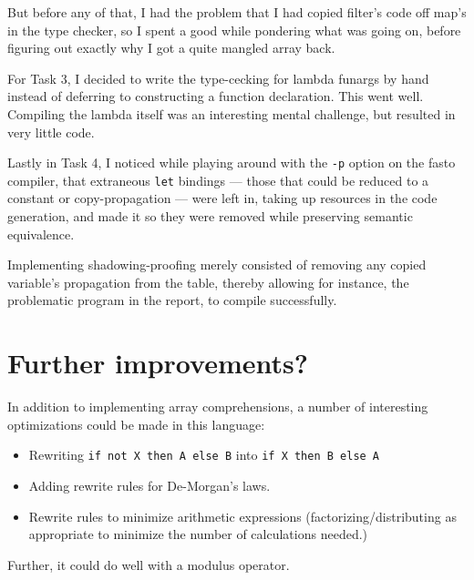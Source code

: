 \documentclass[12pt, a4paper]{article}
\begin{document}
But before any of that, I had the problem that I had copied filter's code off map's
in the type checker, so I spent a good while pondering what was going on, before
figuring out exactly why I got a quite mangled array back.

For Task 3, I decided to write the type-cecking for lambda funargs by hand instead
of deferring to constructing a function declaration. This went well. Compiling the
lambda itself was an interesting mental challenge, but resulted in very little code.

Lastly in Task 4, I noticed while playing around with the \texttt{-p} option on
the fasto compiler, that extraneous \texttt{let} bindings --- those that could
be reduced to a constant or copy-propagation --- were left in, taking up resources
in the code generation, and made it so they were removed while preserving semantic
equivalence.

Implementing shadowing-proofing merely consisted of removing any copied variable's
propagation from the table, thereby allowing for instance, the problematic program
in the report, to compile successfully.

\section{Further improvements?}

In addition to implementing array comprehensions, a number of interesting optimizations
could be made in this language:

\begin{itemize}
    \item Rewriting \verb+if not X then A else B+ into \verb+if X then B else A+
    \item Adding rewrite rules for De-Morgan's laws.
    \item Rewrite rules to minimize arithmetic expressions (factorizing/distributing
        as appropriate to minimize the number of calculations needed.)
\end{itemize}

Further, it could do well with a modulus operator.
\end{document}
